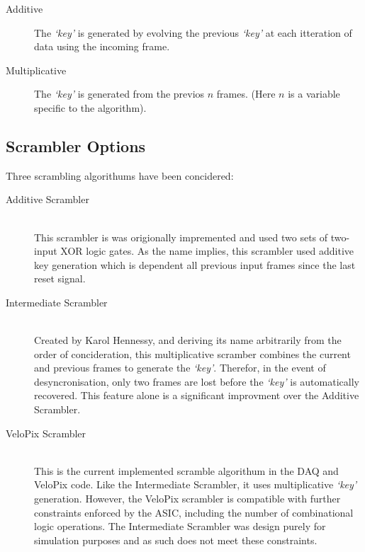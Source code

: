 		\begin{description}
			\item[Additive] The \textit{`key'} is generated by evolving the previous \textit{`key'} at each itteration of data using the incoming frame.
			\item[Multiplicative] The  \textit{`key'} is generated from the previos $n$ frames. (Here $n$ is a variable specific to the algorithm).
		\end{description}

	\subsection{Scrambler Options}
	\label{sub:scrambler_options}

		Three scrambling algorithums have been concidered:

		\begin{description}
			\item[Additive Scrambler] \hfill \\
				This scrambler is was origionally impremented and used two sets of two-input XOR logic gates.
				As the name implies, this scrambler used additive key generation which is dependent all previous input frames since the last reset signal.

			\item[Intermediate Scrambler] \hfill \\
				Created by Karol Hennessy, and deriving its name arbitrarily from the order of concideration, this multiplicative scramber combines the current and previous frames to generate the \textit{`key'}.
				Therefor, in the event of desyncronisation, only two frames are lost before the \textit{`key'} is automatically recovered.
				This feature alone is a significant improvment over the Additive Scrambler.

			\item[VeloPix Scrambler] \hfill \\
				This is the current implemented scramble algorithum in the DAQ and VeloPix code.
				Like the Intermediate Scrambler, it uses multiplicative \textit{`key'} generation.
				However, the VeloPix scrambler is compatible with further constraints enforced by the ASIC, including the number of combinational logic operations.
				The Intermediate Scrambler was design purely for simulation purposes and as such does not meet these constraints.
		\end{description}


